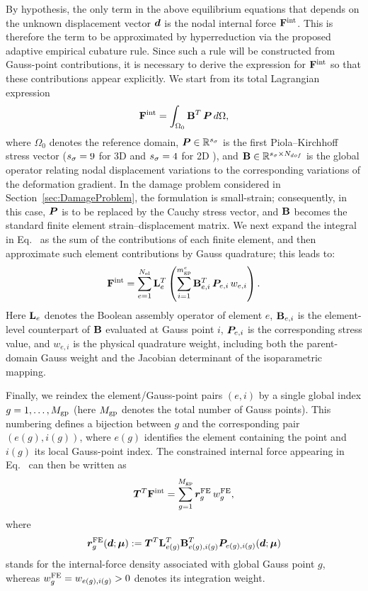 \documentclass[preprint,10pt]{elsarticle}  %
\begin{document}
By hypothesis,  the only term in the above equilibrium equations that
depends on the unknown displacement vector $\bm{d}$ is the nodal internal force $\mathbf{F}^{\mathrm{int}}$. This is
therefore the term to be approximated by hyperreduction via the proposed adaptive  empirical cubature rule.  Since  such a  rule will be constructed from Gauss-point
contributions, it is necessary to derive the expression for $\mathbf{F}^{\mathrm{int}}$ so that these
contributions appear explicitly.  We start from its total Lagrangian expression
\begin{equation}
\label{eq:Fint_continuous_general}
 \mathbf{F}^{\mathrm{int}}
 =
 \int_{\Omega_0}
 \mathbf{B}^T\,\boldsymbol{P}\,d\Omega,
\end{equation}
where \(\Omega_0\) denotes the reference domain, \(\boldsymbol{P} \in \mathbb{R}^{s_{\sigma}}\) is the first
Piola--Kirchhoff stress vector  ($s_{\sigma} = 9$ for 3D and $s_{\sigma} = 4$ for 2D ), and \(\mathbf{B} \in \mathbb{R}^{s_{\sigma} \times N_{dof}}\) is the global operator
relating nodal displacement variations to the corresponding variations of the
deformation gradient. In the damage
problem considered in Section~\ref{sec:DamageProblem}, the formulation is
small-strain; consequently, in this case,  \(\boldsymbol{P}\) is to be replaced by the Cauchy stress
vector, and \(\mathbf{B}\) becomes the standard finite element
strain--displacement matrix. We next expand the integral in Eq.~ as the sum of the   contributions of each finite element, and then approximate  such element contributions by Gauss quadrature; this leads to:
\begin{equation}
\label{eq:Fint_FE_general}
    \mathbf{F}^{\mathrm{int}}
    =
    \sum_{e=1}^{N_{\mathrm{el}}}
   \mathbf{L}_e^T
    \left(
    \sum_{i=1}^{m_{\mathrm{gp}}^{e}}
    \mathbf{B}_{e,i}^T \, \boldsymbol{P}_{e,i} \, w_{e,i}
    \right).
\end{equation}
Here \(\mathbf{L}_e\) denotes the Boolean assembly operator of element \(e\),
\(\mathbf{B}_{e,i}\) is the element-level counterpart of \(\mathbf{B}\) evaluated at
Gauss point \(i\), \(\boldsymbol{P}_{e,i}\) is the corresponding stress value, and
\(w_{e,i}\) is the physical quadrature weight, including both the parent-domain
Gauss weight and the Jacobian determinant of the isoparametric mapping.



Finally, we reindex the element/Gauss-point pairs \((e,i)\) by a
single global index \(g=1,\ldots,M_{\mathrm{gp}}\) (here \(M_{\mathrm{gp}}\) denotes the total number of Gauss points).   This numbering defines a
bijection between \(g\) and the corresponding pair
\((e(g),i(g))\), where \(e(g)\) identifies the element containing the
point and \(i(g)\) its local Gauss-point index. The constrained internal
force appearing in Eq.~ can then be written as
\begin{equation}
\label{eq:projected_internal_force_gp}
    \bm{T}^T\mathbf{F}^{\mathrm{int}}
    =
    \sum_{g=1}^{M_{\mathrm{gp}}}
    \bm{r}^{\mathrm{FE}}_{g}\,w^{\mathrm{FE}}_{g},
\end{equation}
where
\begin{equation}
\label{eq:rFE_general}
    \bm{r}^{\mathrm{FE}}_{g}(\bm{d};\bm{\mu})
    :=
    \bm{T}^T
    \mathbf{L}_{e(g)}^T
    \mathbf{B}_{e(g),i(g)}^T
    \boldsymbol{P}_{e(g),i(g)}(\bm{d};\bm{\mu})
\end{equation}
stands for the internal-force density associated with global Gauss
point \(g\), whereas
\(w^{\mathrm{FE}}_{g}=w_{e(g),i(g)}>0\) denotes its integration weight.
\end{document}
